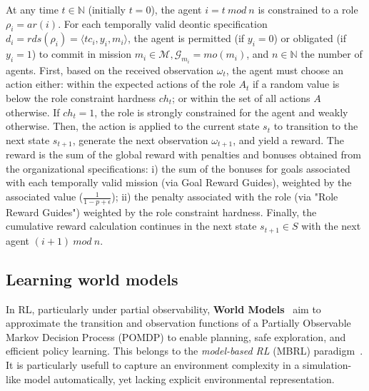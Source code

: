 \documentclass[pdflatex,sn-mathphys-num]{sn-jnl}%
\theoremstyle{thmstyleone}%
\theoremstyle{thmstyletwo}%
\theoremstyle{thmstylethree}%
\begin{document}
At any time $t \in \mathbb{N}$ (initially $t = 0$), the agent $i = t \ mod \ n$ is constrained to a role $\rho_i = ar(i)$. For each temporally valid deontic specification $d_i = rds(\rho_i) = \langle tc_i,y_i, m_i \rangle$, the agent is permitted (if $y_i = 0$) or obligated (if $y_i = 1$) to commit in mission $m_i \in \mathcal{M}, \mathcal{G}_{m_i} = mo(m_i)$, and $n \in \mathbb{N}$ the number of agents.
%
First, based on the received observation $\omega_t$, the agent must choose an action either: within the expected actions of the role $A_t$ if a random value is below the role constraint hardness $ch_t$; or within the set of all actions $A$ otherwise. If $ch_t = 1$, the role is strongly constrained for the agent and weakly otherwise.
%
Then, the action is applied to the current state $s_t$ to transition to the next state $s_{t+1}$, generate the next observation $\omega_{t+1}$, and yield a reward. The reward is the sum of the global reward with penalties and bonuses obtained from the organizational specifications: \quad i) the sum of the bonuses for goals associated with each temporally valid mission (via Goal Reward Guides), weighted by the associated value ($\frac{1}{1-p+\epsilon}$); \quad ii) the penalty associated with the role (via "Role Reward Guides") weighted by the role constraint hardness.
%
Finally, the cumulative reward calculation continues in the next state $s_{t+1} \in S$ with the next agent $(i+1) \ mod \ n$.



\subsection{Learning world models}

In RL, particularly under partial observability, \textbf{World Models}~\cite{ha2018recurrent} aim to approximate the transition and observation functions of a Partially Observable Markov Decision Process (POMDP) to enable planning, safe exploration, and efficient policy learning. This belongs to the \textit{model-based RL} (MBRL) paradigm~\cite{moerland2020model}. It is particularly usefull to capture an environment complexity in a simulation-like model automatically, yet lacking explicit environmental representation.
\end{document}
